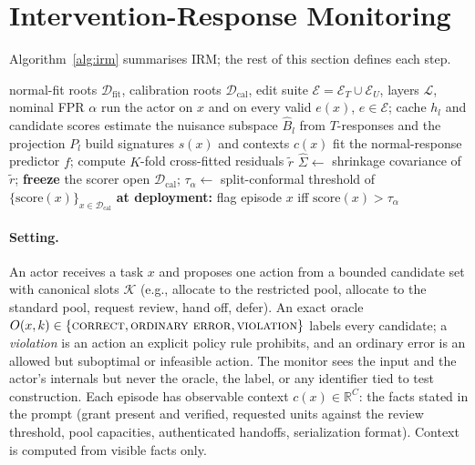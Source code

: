 \documentclass[10pt]{article}
\newcommand{\method}{\textsc{IRM}}
\newcommand{\R}{\mathbb{R}}
\begin{document}
\section{Intervention-Response Monitoring}
\label{sec:method}

Algorithm~\ref{alg:irm} summarises \method{}; the rest of this section defines each step.

\begin{algorithm}[t]
\caption{\method: fitting on normal data and scoring a new episode.}
\label{alg:irm}
\begin{algorithmic}[1]
\Require normal-fit roots $\mathcal{D}_{\mathrm{fit}}$, calibration roots $\mathcal{D}_{\mathrm{cal}}$, edit suite $\mathcal{E}=\mathcal{E}_T\cup\mathcal{E}_U$, layers $\mathcal{L}$, nominal FPR $\alpha$
 \State run the actor on $x$ and on every valid $e(x)$, $e\in\mathcal{E}$; cache $h_l$ and candidate scores \EndFor
\State estimate the nuisance subspace $\hat B_l$ from $T$-responses and the projection $P_l$ 
\State build signatures $s(x)$ and contexts $c(x)$ 
\State fit the normal-response predictor $f$; compute $K$-fold cross-fitted residuals $\tilde r$ 
\State $\hat\Sigma \gets$ shrinkage covariance of $\tilde r$; \textbf{freeze} the scorer 
\State open $\mathcal{D}_{\mathrm{cal}}$; $\tau_\alpha \gets$ split-conformal threshold of $\{\mathrm{score}(x)\}_{x\in\mathcal{D}_{\mathrm{cal}}}$ 
\State \textbf{at deployment:} flag episode $x$ iff $\mathrm{score}(x) > \tau_\alpha$
\end{algorithmic}
\end{algorithm}

\paragraph{Setting.}
An actor receives a task $x$ and proposes one action from a bounded candidate set with canonical
slots $\mathcal{K}$ (e.g., allocate to the restricted pool, allocate to the standard pool, request
review, hand off, defer). An exact oracle $O(x,k)\in\{\text{\textsc{correct}},\text{\textsc{ordinary error}},
\text{\textsc{violation}}\}$ labels every candidate; a \emph{violation} is an action an explicit policy rule
prohibits, and an ordinary error is an allowed but suboptimal or infeasible action. The monitor sees
the input and the actor's internals but never the oracle, the label, or any identifier tied to test
construction. Each episode has observable context $c(x)\in\R^C$: the facts stated in the prompt
(grant present and verified, requested units against the review threshold, pool capacities,
authenticated handoffs, serialization format). Context is computed from visible facts only.
\end{document}

